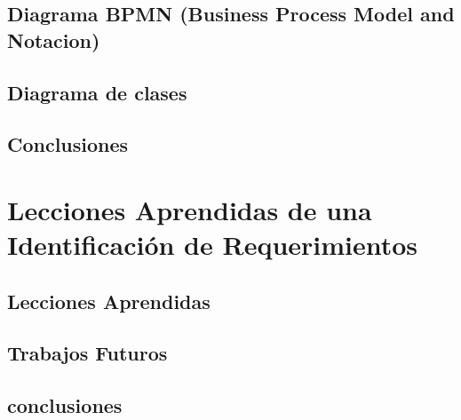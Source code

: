 \documentclass{report}
\begin{document}
    
    
    \section{Diagrama BPMN (Business Process Model and Notacion)}
    
    \section{Diagrama de clases}
    
    \section{Conclusiones}
       
\chapter{Lecciones Aprendidas de una Identificación de Requerimientos}
    
    \section{Lecciones Aprendidas}
    
    \section{Trabajos Futuros}
    
    \section{conclusiones}
\end{document}
